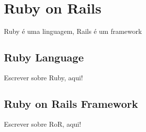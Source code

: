 \thispagestyle{empty}
\chapter{Ruby on Rails}\label{chap:ruby_on_rails}


Ruby é uma linguagem, Rails é um framework

\section{Ruby Language} 
Escrever sobre Ruby, aqui!

\section{Ruby on Rails Framework} 
Escrever sobre RoR, aqui!


% 
% 
% 
% 
%  
% 
% 
% 

